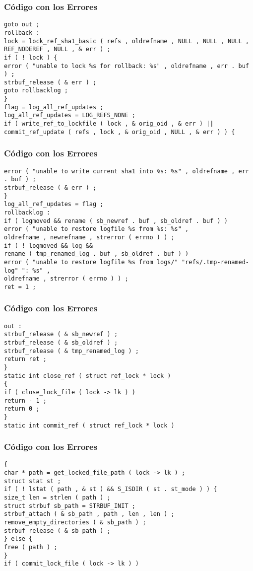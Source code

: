\documentclass{beamer}
\begin{document}
\begin{frame}[fragile]
\frametitle{C\'odigo con los Errores}
\begin{verbatim}
goto out ; 
rollback : 
lock = lock_ref_sha1_basic ( refs , oldrefname , NULL , NULL , NULL , 
REF_NODEREF , NULL , & err ) ; 
if ( ! lock ) { 
error ( "unable to lock %s for rollback: %s" , oldrefname , err . buf ) ; 
strbuf_release ( & err ) ; 
goto rollbacklog ; 
} 
flag = log_all_ref_updates ; 
log_all_ref_updates = LOG_REFS_NONE ; 
if ( write_ref_to_lockfile ( lock , & orig_oid , & err ) || 
commit_ref_update ( refs , lock , & orig_oid , NULL , & err ) ) { 
\end{verbatim}
\end{frame}
\begin{frame}[fragile]
\frametitle{C\'odigo con los Errores}
\begin{verbatim}
error ( "unable to write current sha1 into %s: %s" , oldrefname , err . buf ) ; 
strbuf_release ( & err ) ; 
} 
log_all_ref_updates = flag ; 
rollbacklog : 
if ( logmoved && rename ( sb_newref . buf , sb_oldref . buf ) ) 
error ( "unable to restore logfile %s from %s: %s" , 
oldrefname , newrefname , strerror ( errno ) ) ; 
if ( ! logmoved && log && 
rename ( tmp_renamed_log . buf , sb_oldref . buf ) ) 
error ( "unable to restore logfile %s from logs/" "refs/.tmp-renamed-log" ": %s" , 
oldrefname , strerror ( errno ) ) ; 
ret = 1 ; 
\end{verbatim}
\end{frame}
\begin{frame}[fragile]
\frametitle{C\'odigo con los Errores}
\begin{verbatim}
out : 
strbuf_release ( & sb_newref ) ; 
strbuf_release ( & sb_oldref ) ; 
strbuf_release ( & tmp_renamed_log ) ; 
return ret ; 
} 
static int close_ref ( struct ref_lock * lock ) 
{ 
if ( close_lock_file ( lock -> lk ) ) 
return - 1 ; 
return 0 ; 
} 
static int commit_ref ( struct ref_lock * lock ) 
\end{verbatim}
\end{frame}
\begin{frame}[fragile]
\frametitle{C\'odigo con los Errores}
\begin{verbatim}
{ 
char * path = get_locked_file_path ( lock -> lk ) ; 
struct stat st ; 
if ( ! lstat ( path , & st ) && S_ISDIR ( st . st_mode ) ) { 
size_t len = strlen ( path ) ; 
struct strbuf sb_path = STRBUF_INIT ; 
strbuf_attach ( & sb_path , path , len , len ) ; 
remove_empty_directories ( & sb_path ) ; 
strbuf_release ( & sb_path ) ; 
} else { 
free ( path ) ; 
} 
if ( commit_lock_file ( lock -> lk ) ) 
\end{verbatim}
\end{frame}
\end{document}

